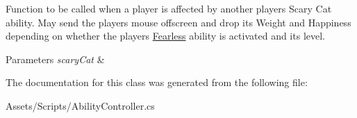 Function to be called when a player is affected by another player\textquotesingle{}s Scary Cat ability. May send the player\textquotesingle{}s mouse offscreen and drop its Weight and Happiness depending on whether the player\textquotesingle{}s \hyperlink{class_fearless}{Fearless} ability is activated and its level. 


\begin{DoxyParams}{Parameters}
{\em scary\+Cat} & \\
\hline
\end{DoxyParams}


The documentation for this class was generated from the following file\+:\begin{DoxyCompactItemize}
\item 
Assets/\+Scripts/Ability\+Controller.\+cs\end{DoxyCompactItemize}
